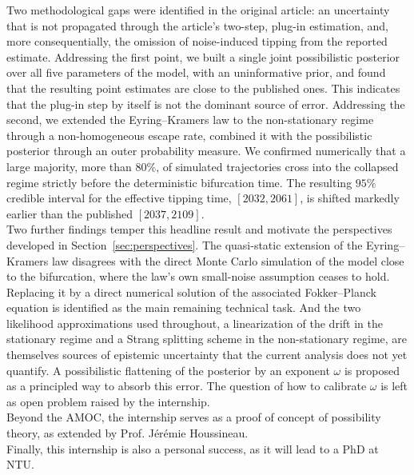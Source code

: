 \documentclass[12pt,a4paper]{article}
\theoremstyle{definition}
\theoremstyle{plain}
\begin{document}
\noindent Two methodological gaps were identified in the original article: an uncertainty that is not
propagated through the article's two-step, plug-in estimation, and, more consequentially, the
omission of noise-induced tipping from the reported estimate. Addressing the first point, we built a single
joint possibilistic posterior over all five parameters of the model, with an uninformative prior, and found that the resulting point estimates are close to the
published ones. This indicates that the plug-in step by itself is not the dominant source of error.
Addressing the second, we extended the Eyring--Kramers law to the non-stationary regime through
a non-homogeneous escape rate, combined it with the possibilistic posterior through an outer
probability measure. We confirmed numerically that a large majority, more than $80\%$, of
simulated trajectories cross into the collapsed regime strictly before the deterministic
bifurcation time. The resulting $95\%$ credible interval for the effective tipping time,
$[2032,2061]$, is shifted markedly earlier than the published $[2037,2109]$.\\
 
\noindent Two further findings temper this headline result and motivate the perspectives developed in
Section~\ref{sec:perspectives}. The quasi-static extension of the Eyring--Kramers law
disagrees with the direct Monte Carlo simulation of the model close to the bifurcation, where
the law's own small-noise assumption ceases to hold. Replacing it by a direct numerical
solution of the associated Fokker--Planck equation is identified as the main remaining
technical task. And the two likelihood approximations used throughout, a linearization of the
drift in the stationary regime and a Strang splitting scheme in the non-stationary regime, are
themselves sources of epistemic uncertainty that the current analysis does not yet quantify. A
possibilistic flattening of the posterior by an exponent $\omega$ is proposed as a principled
way to absorb this error. The question of how to calibrate $\omega$ is
left as open problem raised by the internship.\\
 
\noindent Beyond the AMOC, the internship serves as a proof of concept of possibility theory, as extended by Prof. Jérémie Houssineau.\\
 
\noindent Finally, this internship is also a personal success, as it will lead to a PhD at NTU. \\
\end{document}
